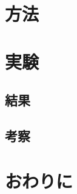 \documentclass[uplatex]{suribt}
\begin{document}
\chapter{方法} %
\chapter{実験}
\section{結果}
\section{考察}

\chapter{おわりに}

\backmatter%

\begin{thebibliography}{}%
 \bibitem{}
\end{thebibliography}

\appendix%
\chapter{}
\end{document}

